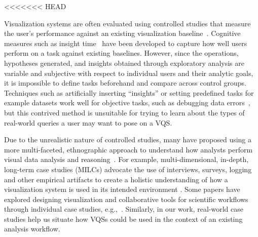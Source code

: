 <<<<<<< HEAD
\par Visualization systems are often evaluated using controlled studies that measure the user's performance against an existing visualization baseline~\cite{Plaisant2004}. Cognitive measures such as insight time~\cite{North2006,Yi2008} have been developed to capture how well users perform on a task against existing baselines. However, since the operations, hypotheses generated, and insights obtained through exploratory analysis are variable and subjective with respect to individual users and their analytic goals, it is impossible to define tasks beforehand and compare across control groups. Techniques such as artificially inserting ``insights'' or setting predefined tasks for example datasets work well for objective tasks, such as debugging data errors~\cite{kandel2011wrangler,Patel2010}, but this contrived method is unsuitable for trying to learn about the types of real-world queries a user may want to pose on a VQS. 
\par Due to the unrealistic nature of controlled studies, many have proposed using a more multi-faceted, ethnographic approach to understand how analysts perform visual data analysis and reasoning~\cite{Plaisant2004,lam2012empirical,shneiderman2006strategies,munzner2009nested,Sedlmair2012}. For example, multi-dimensional, in-depth, long-term case studies (MILCs) advocate the use of interviews, surveys, logging and other empirical artifacts to create a holistic understanding of how a visualization system is used in its intended environment \cite{shneiderman2006strategies}. Some papers have explored designing visualization and collaborative tools for scientific workflows through individual case studies, e.g.,~\cite{Poon2008,Chen2016}. Similarly, in our work, real-world case studies help us situate how VQSs could be used in the context of an existing analysis workflow.  
